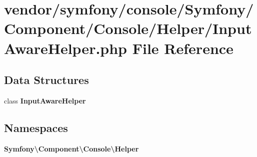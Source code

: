 \section{vendor/symfony/console/\+Symfony/\+Component/\+Console/\+Helper/\+Input\+Aware\+Helper.php File Reference}
\label{_input_aware_helper_8php}
\subsection*{Data Structures}
\begin{DoxyCompactItemize}
\item 
class {\bf Input\+Aware\+Helper}
\end{DoxyCompactItemize}
\subsection*{Namespaces}
\begin{DoxyCompactItemize}
\item 
 {\bf Symfony\textbackslash{}\+Component\textbackslash{}\+Console\textbackslash{}\+Helper}
\end{DoxyCompactItemize}
